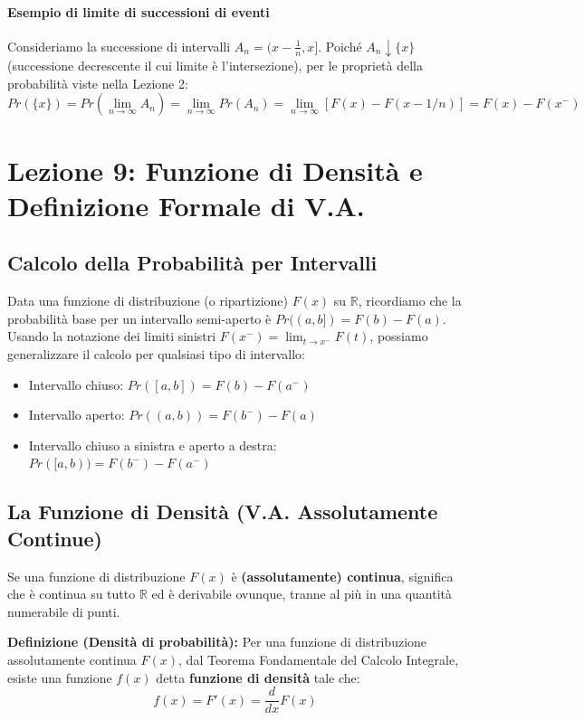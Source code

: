 \documentclass[12pt, a4paper]{article}
\begin{document}
\paragraph{Esempio di limite di successioni di eventi}
Consideriamo la successione di intervalli $A_n = (x - \frac{1}{n}, x]$. Poiché $A_n \downarrow \{x\}$ (successione decrescente il cui limite è l'intersezione), per le proprietà della probabilità viste nella Lezione 2:
$$ Pr(\{x\}) = Pr\left(\lim_{n \to \infty} A_n\right) = \lim_{n \to \infty} Pr(A_n) = \lim_{n \to \infty} [F(x) - F(x - 1/n)] = F(x) - F(x^-) $$

\section{Lezione 9: Funzione di Densità e Definizione Formale di V.A.}

\subsection{Calcolo della Probabilità per Intervalli}
Data una funzione di distribuzione (o ripartizione) $F(x)$ su $\mathbb{R}$, ricordiamo che la probabilità base per un intervallo semi-aperto è $Pr((a, b]) = F(b) - F(a)$. 
Usando la notazione dei limiti sinistri $F(x^-) = \lim_{t \to x^-} F(t)$, possiamo generalizzare il calcolo per qualsiasi tipo di intervallo:
\begin{itemize}
    \item Intervallo chiuso: $Pr([a, b]) = F(b) - F(a^-)$
    \item Intervallo aperto: $Pr((a, b)) = F(b^-) - F(a)$
    \item Intervallo chiuso a sinistra e aperto a destra: $Pr([a, b)) = F(b^-) - F(a^-)$
\end{itemize}

\subsection{La Funzione di Densità (V.A. Assolutamente Continue)}
Se una funzione di distribuzione $F(x)$ è \textbf{(assolutamente) continua}, significa che è continua su tutto $\mathbb{R}$ ed è derivabile ovunque, tranne al più in una quantità numerabile di punti.

\textbf{Definizione (Densità di probabilità):} Per una funzione di distribuzione assolutamente continua $F(x)$, dal Teorema Fondamentale del Calcolo Integrale, esiste una funzione $f(x)$ detta \textbf{funzione di densità} tale che:
$$ f(x) = F'(x) = \frac{d}{dx}F(x) $$
\end{document}
